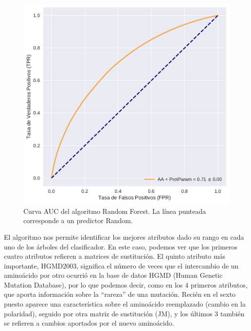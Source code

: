 
\begin{figure}[H]
    \centering
    \includegraphics[scale=0.73]{documents/latex/figures/3/auc_1.pdf}
    \caption{Curva AUC del algoritmo Random Forest. La línea punteada corresponde a un predictor Random.}
    \label{fig:auc_1}
\end{figure}




El algoritmo nos permite identificar los mejores atributos dado su rango en cada uno de los árboles del clasificador. En este caso, podemos ver que los primeros cuatro atributos refieren a matrices de sustitución. El quinto atributo más importante, HGMD2003, significa el número de veces que el intercambio de un aminoácido por otro ocurrió en la base de datos HGMD (Human Genetic Mutation Database), por lo que podemos decir, como en los 4 primeros atributos, que aporta información sobre la ``rareza'' de una mutación. Recién en el sexto puesto aparece una característica sobre el aminoácido reemplazado (cambio en la polaridad), seguido por otra matriz de sustitución (JM), y los últimos 3 también se refieren a cambios aportados por el nuevo aminoácido.

